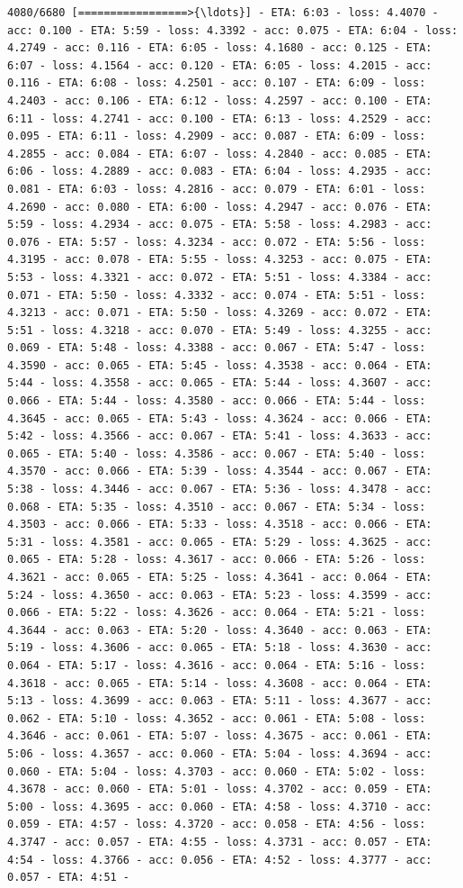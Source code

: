 \documentclass[11pt]{article}
\begin{document}
\begin{Verbatim}[commandchars=\\\{\}]
4080/6680 [=================>{\ldots}] - ETA: 6:03 - loss: 4.4070 - acc: 0.100 - ETA: 5:59 - loss: 4.3392 - acc: 0.075 - ETA: 6:04 - loss: 4.2749 - acc: 0.116 - ETA: 6:05 - loss: 4.1680 - acc: 0.125 - ETA: 6:07 - loss: 4.1564 - acc: 0.120 - ETA: 6:05 - loss: 4.2015 - acc: 0.116 - ETA: 6:08 - loss: 4.2501 - acc: 0.107 - ETA: 6:09 - loss: 4.2403 - acc: 0.106 - ETA: 6:12 - loss: 4.2597 - acc: 0.100 - ETA: 6:11 - loss: 4.2741 - acc: 0.100 - ETA: 6:13 - loss: 4.2529 - acc: 0.095 - ETA: 6:11 - loss: 4.2909 - acc: 0.087 - ETA: 6:09 - loss: 4.2855 - acc: 0.084 - ETA: 6:07 - loss: 4.2840 - acc: 0.085 - ETA: 6:06 - loss: 4.2889 - acc: 0.083 - ETA: 6:04 - loss: 4.2935 - acc: 0.081 - ETA: 6:03 - loss: 4.2816 - acc: 0.079 - ETA: 6:01 - loss: 4.2690 - acc: 0.080 - ETA: 6:00 - loss: 4.2947 - acc: 0.076 - ETA: 5:59 - loss: 4.2934 - acc: 0.075 - ETA: 5:58 - loss: 4.2983 - acc: 0.076 - ETA: 5:57 - loss: 4.3234 - acc: 0.072 - ETA: 5:56 - loss: 4.3195 - acc: 0.078 - ETA: 5:55 - loss: 4.3253 - acc: 0.075 - ETA: 5:53 - loss: 4.3321 - acc: 0.072 - ETA: 5:51 - loss: 4.3384 - acc: 0.071 - ETA: 5:50 - loss: 4.3332 - acc: 0.074 - ETA: 5:51 - loss: 4.3213 - acc: 0.071 - ETA: 5:50 - loss: 4.3269 - acc: 0.072 - ETA: 5:51 - loss: 4.3218 - acc: 0.070 - ETA: 5:49 - loss: 4.3255 - acc: 0.069 - ETA: 5:48 - loss: 4.3388 - acc: 0.067 - ETA: 5:47 - loss: 4.3590 - acc: 0.065 - ETA: 5:45 - loss: 4.3538 - acc: 0.064 - ETA: 5:44 - loss: 4.3558 - acc: 0.065 - ETA: 5:44 - loss: 4.3607 - acc: 0.066 - ETA: 5:44 - loss: 4.3580 - acc: 0.066 - ETA: 5:44 - loss: 4.3645 - acc: 0.065 - ETA: 5:43 - loss: 4.3624 - acc: 0.066 - ETA: 5:42 - loss: 4.3566 - acc: 0.067 - ETA: 5:41 - loss: 4.3633 - acc: 0.065 - ETA: 5:40 - loss: 4.3586 - acc: 0.067 - ETA: 5:40 - loss: 4.3570 - acc: 0.066 - ETA: 5:39 - loss: 4.3544 - acc: 0.067 - ETA: 5:38 - loss: 4.3446 - acc: 0.067 - ETA: 5:36 - loss: 4.3478 - acc: 0.068 - ETA: 5:35 - loss: 4.3510 - acc: 0.067 - ETA: 5:34 - loss: 4.3503 - acc: 0.066 - ETA: 5:33 - loss: 4.3518 - acc: 0.066 - ETA: 5:31 - loss: 4.3581 - acc: 0.065 - ETA: 5:29 - loss: 4.3625 - acc: 0.065 - ETA: 5:28 - loss: 4.3617 - acc: 0.066 - ETA: 5:26 - loss: 4.3621 - acc: 0.065 - ETA: 5:25 - loss: 4.3641 - acc: 0.064 - ETA: 5:24 - loss: 4.3650 - acc: 0.063 - ETA: 5:23 - loss: 4.3599 - acc: 0.066 - ETA: 5:22 - loss: 4.3626 - acc: 0.064 - ETA: 5:21 - loss: 4.3644 - acc: 0.063 - ETA: 5:20 - loss: 4.3640 - acc: 0.063 - ETA: 5:19 - loss: 4.3606 - acc: 0.065 - ETA: 5:18 - loss: 4.3630 - acc: 0.064 - ETA: 5:17 - loss: 4.3616 - acc: 0.064 - ETA: 5:16 - loss: 4.3618 - acc: 0.065 - ETA: 5:14 - loss: 4.3608 - acc: 0.064 - ETA: 5:13 - loss: 4.3699 - acc: 0.063 - ETA: 5:11 - loss: 4.3677 - acc: 0.062 - ETA: 5:10 - loss: 4.3652 - acc: 0.061 - ETA: 5:08 - loss: 4.3646 - acc: 0.061 - ETA: 5:07 - loss: 4.3675 - acc: 0.061 - ETA: 5:06 - loss: 4.3657 - acc: 0.060 - ETA: 5:04 - loss: 4.3694 - acc: 0.060 - ETA: 5:04 - loss: 4.3703 - acc: 0.060 - ETA: 5:02 - loss: 4.3678 - acc: 0.060 - ETA: 5:01 - loss: 4.3702 - acc: 0.059 - ETA: 5:00 - loss: 4.3695 - acc: 0.060 - ETA: 4:58 - loss: 4.3710 - acc: 0.059 - ETA: 4:57 - loss: 4.3720 - acc: 0.058 - ETA: 4:56 - loss: 4.3747 - acc: 0.057 - ETA: 4:55 - loss: 4.3731 - acc: 0.057 - ETA: 4:54 - loss: 4.3766 - acc: 0.056 - ETA: 4:52 - loss: 4.3777 - acc: 0.057 - ETA: 4:51 - 
\end{Verbatim}
\end{document}
